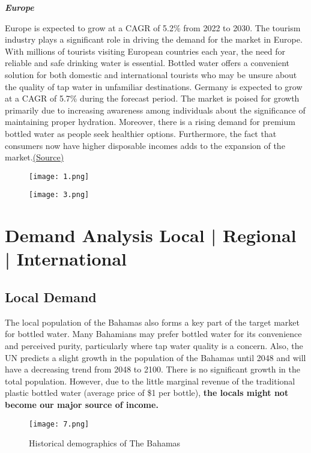 \documentclass{article}
\begin{document}
\textit{\textbf{Europe}}\par
Europe is expected to grow at a CAGR of 5.2\% from 2022 to 2030. The tourism industry plays a significant role in driving the demand for the market in Europe. With millions of tourists visiting European countries each year, the need for reliable and safe drinking water is essential. Bottled water offers a convenient solution for both domestic and international tourists who may be unsure about the quality of tap water in unfamiliar destinations. Germany is expected to grow at a CAGR of 5.7\% during the forecast period. The market is poised for growth primarily due to increasing awareness among individuals about the significance of maintaining proper hydration. Moreover, there is a rising demand for premium bottled water as people seek healthier options. Furthermore, the fact that consumers now have higher disposable incomes adds to the expansion of the market.\href{https://www.grandviewresearch.com/industry-analysis/bottled-water-market}{(Source)}
\begin{figure}[H]
\centering
\texttt{[image: 1.png]}
\label{fig:unique_label_3}
\end{figure}

\begin{figure}[H]
\centering
\texttt{[image: 3.png]}
\label{fig:unique_label_4}
\end{figure}

\section{Demand Analysis Local | Regional | International}
\subsection{Local Demand}
The local population of the Bahamas also forms a key part of the target market for bottled water. Many Bahamians may prefer bottled water for its convenience and perceived purity, particularly where tap water quality is a concern. Also, the UN predicts a slight growth in the population of the Bahamas until 2048 and will have a decreasing trend from 2048 to 2100. There is no significant growth in the total population. However, due to the little marginal revenue of the traditional plastic bottled water (average price of \$1 per bottle), \textbf{the locals might not become our major source of income.} 

\begin{figure}[H]
\centering
\texttt{[image: 7.png]}
\caption{Historical demographics of The Bahamas }
\label{fig:unique_label_8}
\end{figure}
\end{document}

